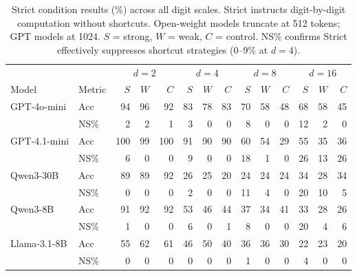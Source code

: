 \begin{table}[t]
\centering
\small
\caption{Strict condition results (\%) across all digit scales. Strict instructs digit-by-digit computation without shortcuts. Open-weight models truncate at 512 tokens; GPT models at 1024. $S$ = strong, $W$ = weak, $C$ = control. NS\% confirms Strict effectively suppresses shortcut strategies (0--9\% at $d{=}4$).}
\label{tab:strict}
\begin{tabular}{ll|rrr|rrr|rrr|rrr}
\toprule
 & & \multicolumn{3}{c|}{$d=2$} & \multicolumn{3}{c|}{$d=4$} & \multicolumn{3}{c|}{$d=8$} & \multicolumn{3}{c}{$d=16$} \\
Model & Metric & $S$ & $W$ & $C$ & $S$ & $W$ & $C$ & $S$ & $W$ & $C$ & $S$ & $W$ & $C$ \\
\midrule
GPT-4o-mini  & Acc  & 94 & 96 & 92 & 83 & 78 & 83 & 70 & 58 & 48 & 68 & 58 & 45 \\
             & NS\% & 2 & 2 & 1 & 3 & 0 & 0 & 8 & 0 & 0 & 12 & 2 & 0 \\
\midrule
GPT-4.1-mini & Acc  & 100 & 99 & 100 & 91 & 90 & 90 & 60 & 54 & 29 & 55 & 35 & 36 \\
             & NS\% & 6 & 0 & 0 & 9 & 0 & 0 & 18 & 1 & 0 & 26 & 13 & 26 \\
\midrule
Qwen3-30B    & Acc  & 89 & 89 & 92 & 26 & 25 & 20 & 24 & 24 & 24 & 34 & 28 & 34 \\
             & NS\% & 0 & 0 & 0 & 2 & 0 & 0 & 11 & 4 & 0 & 20 & 10 & 5 \\
\midrule
Qwen3-8B     & Acc  & 91 & 92 & 92 & 53 & 46 & 44 & 37 & 34 & 41 & 33 & 28 & 26 \\
             & NS\% & 1 & 0 & 0 & 6 & 0 & 1 & 8 & 0 & 0 & 20 & 4 & 6 \\
\midrule
Llama-3.1-8B & Acc  & 55 & 62 & 61 & 46 & 50 & 40 & 36 & 36 & 30 & 22 & 23 & 20 \\
             & NS\% & 0 & 0 & 0 & 0 & 0 & 0 & 1 & 0 & 0 & 4 & 0 & 0 \\
\bottomrule
\end{tabular}
\end{table}
